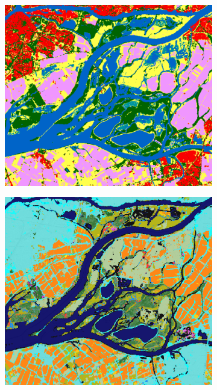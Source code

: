 \begin{figure}[H]
\begin{subfigure}[t]{0.243\textwidth}
    \end{subfigure}
    \hfill %
    \begin{subfigure}[t]{0.243\textwidth}
        \centering
        \includegraphics[width=\textwidth,height=\textwidth]{figs_01/a_worldcover_clean.png}
    \end{subfigure}
    \hfill %
    \begin{subfigure}[t]{0.243\textwidth}
        \centering
        \includegraphics[width=\textwidth,height=\textwidth]{figs_01/a_glad_clean.png}

\end{subfigure}
\end{figure}
